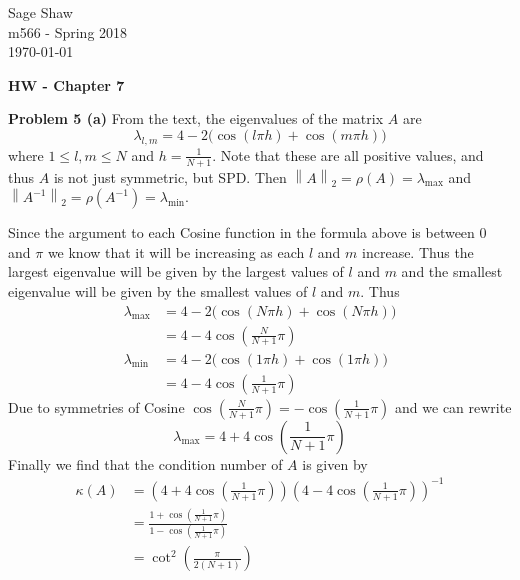 \documentclass[12pt]{article}
\newcommand{\problem}[1]{\hspace{-4 ex} \large \textbf{Problem #1} }
\newcommand{\norm}[1]{\left\lVert#1\right\rVert}
\begin{document}
	\thispagestyle{empty}
	
	\begin{flushright}
		Sage Shaw \\
		m566 - Spring 2018 \\
		\today
	\end{flushright}
	
{\large \textbf{HW - Chapter 7}}\bigbreak

\problem{5 (a)} From the text, the eigenvalues of the matrix $A$ are 
$$\lambda_{l,m} = 4 - 2 \big( \cos(l \pi h) + \cos(m \pi h) \big)$$
where $1 \leq l,m \leq N$ and $h = \frac{1}{N+1}$. Note that these are all positive values, and thus $A$ is not just symmetric, but SPD. Then $\norm{A}_2 = \rho(A) = \lambda_{\text{max}}$ and $\norm{A^{-1}}_2 = \rho(A^{-1}) = \lambda_{\text{min}}$. \break

Since the argument to each Cosine function in the formula above is between $0$ and $\pi$ we know that it will be increasing as each $l$ and $m$ increase. Thus the largest eigenvalue will be given by the largest values of $l$ and $m$ and the smallest eigenvalue will be given by the smallest values of $l$ and $m$. Thus 
\begin{align*}
	\lambda_\text{max} & = 4 - 2 \big( \cos(N \pi h) + \cos(N \pi h) \big) \\
	& = 4 - 4 \cos\left(\frac{N }{N+1}\pi \right) \\
	\lambda_\text{min} & = 4 - 2 \big( \cos(1 \pi h) + \cos(1 \pi h) \big) \\
	& = 4 - 4 \cos\left(\frac{1 }{N+1}\pi \right)
\end{align*}
Due to symmetries of Cosine $\cos\left(\frac{N }{N+1}\pi \right) = -\cos\left(\frac{1 }{N+1}\pi \right)$ and we can rewrite
$$
\lambda_\text{max} = 4 + 4 \cos\left(\frac{1 }{N+1}\pi \right)
$$
Finally we find that the condition number of $A$ is given by
\begin{align*}
	\kappa(A) & = \left( 4 + 4 \cos\left(\frac{1 }{N+1}\pi \right) \right) 
		\left( 4 - 4 \cos\left(\frac{1 }{N+1}\pi \right) \right)^{-1} \\
	& = \frac{1 + \cos\left(\frac{1 }{N+1}\pi \right)}{ 1 - \cos\left(\frac{1 }{N+1}\pi \right)} \\
	& = \cot^2\left(\frac{\pi }{2(N+1)} \right)
\end{align*}
\end{document}
